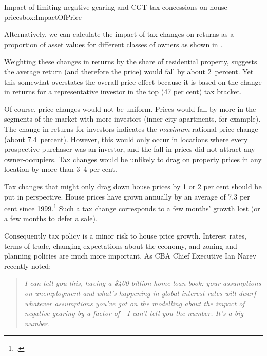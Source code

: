\begin{bigboxC*}{Impact of limiting negative gearing {and CGT} tax concessions on house prices}{box:ImpactOfPrice}
\begin{table}[H]
{}

\end{table}
Alternatively, we can calculate the impact of tax changes on returns as a proportion of asset values for different classes of owners as shown in
.

Weighting these changes in returns by the share of residential property, suggests the average return (and therefore the price) would fall by about 2~percent. Yet this somewhat overstates the overall price effect because it is based on the change in returns for a representative investor in the top (47 per cent) tax bracket.

Of course, price changes would not be uniform. Prices would fall by more in the segments of the market with more investors (inner city apartments, for example). The change in returns for investors indicates the \emph{maximum} rational price change (about 7.4~percent). However, this would only occur in locations where every prospective purchaser was an investor, and the fall in prices did not attract any owner-occupiers. Tax changes would be unlikely to drag on property prices in any location by more than 3--4 per cent.

\end{bigboxC*}

Tax changes that might only drag down house prices by 1 or 2 per cent should be put in perspective. House prices have grown annually by an average of 7.3 per cent since 1999.\footcites{ABS2015ResidentialPropertyIndex}{Yates2011}
Such a tax change corresponds to a few months’ growth lost (or a few months to defer a sale).

Consequently tax policy is a minor risk to house price growth.  Interest rates, terms of trade, changing expectations about the economy, and zoning and planning policies are much more important. As CBA Chief Executive Ian Narev recently noted:

\begin{quote} 
\textit{I can tell you this, having a \$400 billion home loan book: your assumptions on unemployment and what's happening in global interest rates will dwarf whatever assumptions you've got on the modelling about the impact of negative gearing by a factor of---I can't tell you the number. It's a big number.}
\end{quote}


